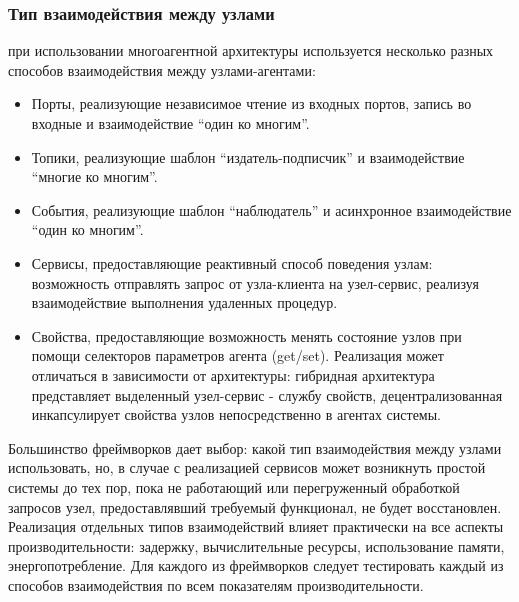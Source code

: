 \subsubsection{Тип взаимодействия между узлами} при использовании многоагентной архитектуры используется несколько разных способов взаимодействия между узлами-агентами:
\begin{itemize}
	\item Порты, реализующие независимое чтение из входных портов, запись во входные и взаимодействие \enquote{один ко многим}.
	\item Топики, реализующие шаблон \enquote{издатель-подписчик} и взаимодействие \enquote{многие ко многим}.
	\item События, реализующие шаблон \enquote{наблюдатель} и асинхронное взаимодействие \enquote{один ко многим}.
	\item Сервисы, предоставляющие реактивный способ поведения узлам: возможность отправлять запрос от узла-клиента на узел-сервис, реализуя взаимодействие выполнения удаленных процедур.
	\item Свойства, предоставляющие возможность менять состояние узлов при помощи селекторов параметров агента (get/set). Реализация может отличаться в зависимости от архитектуры: гибридная архитектура представляет выделенный узел-сервис - службу свойств, децентрализованная инкапсулирует свойства узлов непосредственно в агентах системы.
\end{itemize}

Большинство фреймворков дает выбор: какой тип взаимодействия между узлами использовать, но, в случае с реализацией сервисов может возникнуть простой системы до тех пор, пока не работающий или перегруженный обработкой запросов узел, предоставлявший требуемый функционал, не будет восстановлен. Реализация отдельных типов взаимодействий влияет практически на все аспекты производительности: задержку, вычислительные ресурсы, использование памяти, энергопотребление. Для каждого из фреймворков следует тестировать каждый из способов взаимодействия по всем показателям производительности.

